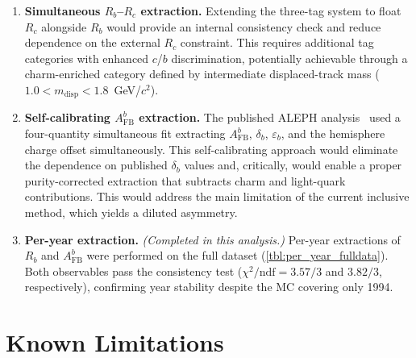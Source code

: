 \documentclass[11pt,a4paper]{article}
\begin{document}
\begin{enumerate}
\item \textbf{Simultaneous $R_b$--$R_c$ extraction.}
  Extending the three-tag system to float $R_c$ alongside $R_b$
  would provide an internal consistency check and reduce
  dependence on the external $R_c$ constraint.
  This requires additional tag categories with enhanced $c$/$b$
  discrimination, potentially achievable through a charm-enriched
  category defined by intermediate displaced-track mass
  ($1.0 < m_\text{disp} < 1.8$~GeV/$c^2$).

\item \textbf{Self-calibrating $A_\text{FB}^b$ extraction.}
  The published ALEPH analysis~\cite{ALEPH:AFBb} used a
  four-quantity simultaneous fit extracting $A_\text{FB}^b$,
  $\delta_b$, $\varepsilon_b$, and the hemisphere charge offset
  simultaneously.
  This self-calibrating approach would eliminate the dependence
  on published $\delta_b$ values and, critically, would enable
  a proper purity-corrected extraction that subtracts charm and
  light-quark contributions.
  This would address the main limitation of the current inclusive
  method, which yields a diluted asymmetry.

\item \textbf{Per-year extraction.}
  \textit{(Completed in this analysis.)}
  Per-year extractions of $R_b$ and $A_\text{FB}^b$ were performed
  on the full dataset (\cref{tbl:per_year_fulldata}).
  Both observables pass the consistency test
  ($\chi^2/\text{ndf} = 3.57/3$ and $3.82/3$, respectively),
  confirming year stability despite the MC covering only 1994.
\end{enumerate}

\section{Known Limitations}
\label{sec:limitations}
\end{document}
